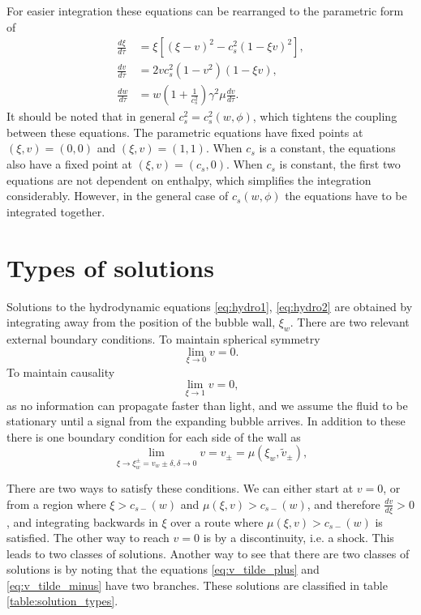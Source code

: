For easier integration these equations can be rearranged to the parametric form of
\cite[eq. B.14-16]{hindmarsh_gw_pt_2019}
\begin{align}
\frac{d\xi}{d\tau} &= \xi \left[ (\xi - v)^2 - c_s^2 (1 - \xi v)^2 \right], \\
\frac{dv}{d\tau} &= 2 v c_s^2 (1 - v^2) (1 - \xi v), \\
\frac{dw}{d\tau} &= w \left( 1 + \frac{1}{c_s^2} \right) \gamma^2 \mu \frac{dv}{d\tau}.
\end{align}
It should be noted that in general $c_s^2 = c_s^2(w,\phi)$, which tightens the coupling between these equations.
The parametric equations have fixed points at
$(\xi,v) = (0,0)$ and
$(\xi,v) = (1,1)$.
When $c_s$ is a constant, the equations also have a fixed point at
$(\xi,v) = (c_s,0)$.
When $c_s$ is constant, the first two equations are not dependent on enthalpy, which simplifies the integration considerably.
However, in the general case of $c_s(w,\phi)$ the equations have to be integrated together.


\section{Types of solutions}
Solutions to the hydrodynamic equations \eqref{eq:hydro1}, \eqref{eq:hydro2} are obtained by integrating away from the position of the bubble wall, $\xi_w$.
There are two relevant external boundary conditions.
To maintain spherical symmetry
\begin{equation}
\lim_{\xi \rightarrow 0} v = 0.
\end{equation}
To maintain causality
\begin{equation}
\lim_{\xi \rightarrow 1} v = 0,
\end{equation}
as no information can propagate faster than light, and we assume the fluid to be stationary until a signal from the expanding bubble arrives.
In addition to these there is one boundary condition for each side of the wall as
\begin{equation}
\lim_{\xi \rightarrow \xi_w^\pm = v_w \pm \delta, \delta \rightarrow 0} v = v_\pm = \mu (\xi_w, \tilde{v}_\pm),
\end{equation}

There are two ways to satisfy these conditions.
We can either start at $v=0$, or from a region where $\xi > c_{s-}(w)$ and $\mu(\xi,v) > c_{s-}(w)$, and therefore $\frac{dv}{d\xi} > 0$,
and integrating backwards in $\xi$ over a route where $\mu(\xi,v) > c_{s-}(w)$ is satisfied.
The other way to reach $v=0$ is by a discontinuity, i.e. a shock.
This leads to two classes of solutions.
Another way to see that there are two classes of solutions is by noting
that the equations \eqref{eq:v_tilde_plus} and \eqref{eq:v_tilde_minus} have two branches.
These solutions are classified in table \ref{table:solution_types}.

